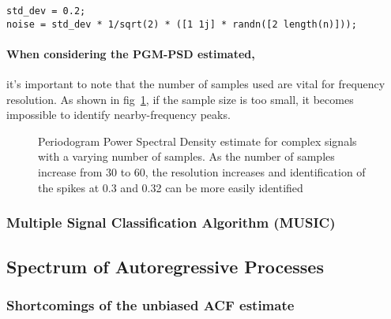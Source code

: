 \documentclass[main.tex]{subfiles}
\begin{document}
\begin{lstlisting}[frame=single]
std_dev = 0.2;
noise = std_dev * 1/sqrt(2) * ([1 1j] * randn([2 length(n)]));
\end{lstlisting}

\paragraph{When considering the PGM-PSD estimated, } it's important to note that the number of samples used are vital for frequency resolution. As shown in fig~\ref{fig:q2_1_d}, if the sample size is too small, it becomes impossible to identify nearby-frequency peaks. 

\begin{figure}[H]
	\centering 
	\resizebox{\textwidth}{!}{}
	\caption{Periodogram Power Spectral Density estimate for complex signals with a varying number of samples. As the number of samples increase from 30 to 60, the resolution increases and identification of the spikes at 0.3 and 0.32 can be more easily identified}
	\label{fig:q2_1_d}
\end{figure}


\subsubsection{Multiple Signal Classification Algorithm (MUSIC)}



\begin{figure}[H]
	\centering 
	\resizebox{\textwidth}{!}{}
	\caption{}
	\label{fig:q2_1_e}
\end{figure}



\subsection{Spectrum of Autoregressive Processes}


\subsubsection{Shortcomings of the unbiased ACF estimate}
\end{document}
